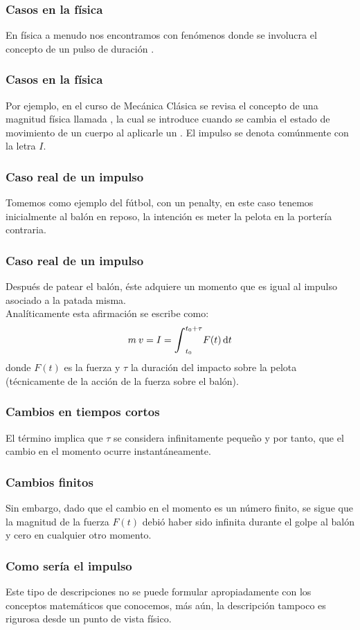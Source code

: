 \documentclass[12pt]{beamer}
\begin{document}
\begin{frame}
\frametitle{Casos en la física}
En física a menudo nos encontramos con fenómenos donde se involucra el concepto de un pulso de duración .
\end{frame}
\begin{frame}
\frametitle{Casos en la física}
Por ejemplo, en el curso de Mecánica Clásica se revisa el concepto de una magnitud física llamada , \pause la cual se introduce cuando se cambia el estado de movimiento de un cuerpo al aplicarle un . \pause El impulso se denota comúnmente con la letra $I$.
\end{frame}
\begin{frame}
\frametitle{Caso real de un impulso}
Tomemos como ejemplo del fútbol, con un penalty, \pause en este caso tenemos inicialmente al balón en reposo, la intención es meter la pelota en la portería contraria.
\end{frame}
\begin{frame}
\frametitle{Caso real de un impulso}
Después de patear el balón, éste adquiere un momento que es igual al impulso asociado a la patada misma.
\\
\bigskip
\pause
Analíticamente esta afirmación se escribe como:
\begin{align*}
m \: v = I = \scaleint{6ex}_{t_{0}}^{t_{0} + \tau} F (t) \dd{t}
\end{align*}
donde $F(t)$ es la fuerza y $\tau$ la duración del impacto sobre la pelota (técnicamente de la acción de la fuerza sobre el balón).
\end{frame}
\begin{frame}
\frametitle{Cambios en tiempos cortos}
El término  implica que $\tau$ se considera infinitamente pequeño y por tanto, que el cambio en el momento ocurre instantáneamente.
\end{frame}
\begin{frame}
\frametitle{Cambios finitos}
Sin embargo, dado que el cambio en el momento es un número finito, se sigue que la magnitud de la fuerza $F (t)$ debió haber sido infinita durante el golpe al balón y cero en cualquier otro momento.
\end{frame}
\begin{frame}
\frametitle{Como sería el impulso}
Este tipo de descripciones no se puede formular apropiadamente con los conceptos matemáticos que conocemos, más aún, la descripción tampoco es rigurosa desde un punto de vista físico.
\end{frame}
\end{document}
